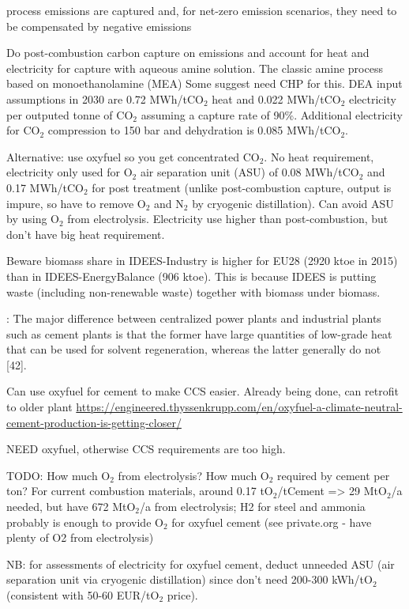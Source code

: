 process emissions are captured and, for net-zero emission scenarios, 
they need to be compensated by negative emissions

Do post-combustion carbon capture on emissions and account for heat and
electricity for capture with aqueous amine solution. The classic amine process
based on monoethanolamine (MEA) Some suggest need CHP for this. DEA input
assumptions in 2030 are 0.72 MWh/tCO$_2$ heat and 0.022 MWh/tCO$_2$ electricity
per outputed tonne of CO$_2$ assuming a capture rate of 90\%. Additional
electricity for CO$_2$ compression to 150 bar and dehydration is 0.085
MWh/tCO$_2$.

Alternative: use oxyfuel so you get concentrated CO$_2$. No heat requirement,
electricity only used for O$_2$ air separation unit (ASU) of 0.08 MWh/tCO$_2$
and 0.17 MWh/tCO$_2$ for post treatment (unlike post-combustion capture, output
is impure, so have to remove O$_2$ and N$_2$ by cryogenic distillation). Can
avoid ASU by using O$_2$ from electrolysis. Electricity use higher than
post-combustion, but don't have big heat requirement.

Beware biomass share in IDEES-Industry is higher for EU28 (2920 ktoe in 2015)
than in IDEES-EnergyBalance (906 ktoe). This is because IDEES is putting waste
(including non-renewable waste) together with biomass under biomass.

: The major difference between centralized power plants and
industrial plants such as cement plants is that the former have large quantities
of low-grade heat that can be used for solvent regeneration, whereas the latter
generally do not [42].


Can use oxyfuel for cement to make CCS easier. Already being done, can retrofit
to older plant
\url{https://engineered.thyssenkrupp.com/en/oxyfuel-a-climate-neutral-cement-production-is-getting-closer/}

NEED oxyfuel, otherwise CCS requirements are too high.

TODO: How much O$_2$ from electrolysis? How much O$_2$ required by cement per
ton? For current combustion materials, around 0.17 tO$_2$/tCement => 29
MtO$_2$/a needed, but have 672 MtO$_2$/a from electrolysis; H2 for steel and
ammonia probably is enough to provide O$_2$ for oxyfuel cement (see private.org
- have plenty of O2 from electrolysis)

NB: for assessments of electricity for oxyfuel cement, deduct unneeded ASU (air
separation unit via cryogenic distillation) since don't need 200-300 kWh/tO$_2$
(consistent with 50-60 EUR/tO$_2$ price).

